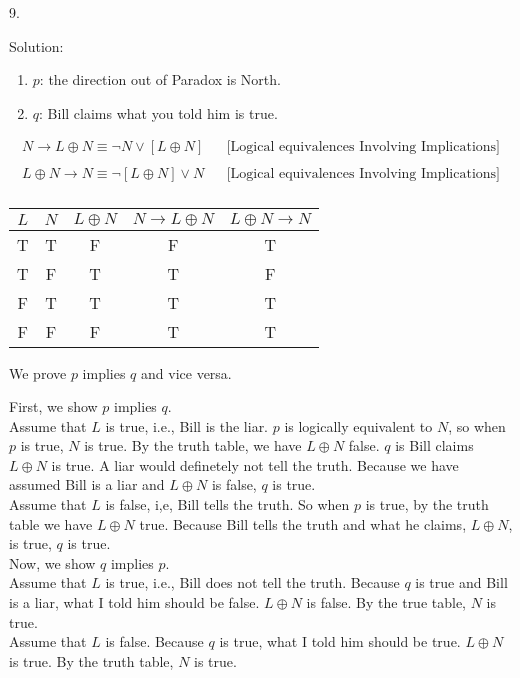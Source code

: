 \documentclass[12pt]{article}
\begin{document}
9. 

\indent Solution:\\
\begin{enumerate}
    \item \label{NisDir} $p$: the direction out of Paradox is North.
    \item \label{BsaysItrue} $q$: Bill claims what you told him is true.
\end{enumerate}
\begin{align*}
N \to L \oplus N \equiv \lnot N \lor [L \oplus N] && \text{[Logical equivalences Involving Implications]}\\ 
\end{align*}
\begin{align*}
L \oplus N \to N \equiv \lnot [L \oplus N] \lor N &&  \text{[Logical equivalences Involving Implications]} \\
\end{align*}

\begin{center}
\begin{tabular}{c|c|c|c|c}
    $L$ & $N$ & $L \oplus N$ & $N \to L \oplus N$ & $L \oplus N \to N$ \\
\hline
T & T & F & F & T \\
T & F & T & T & F \\
F & T & T & T & T \\
F & F & F & T & T
\end{tabular}
\end{center}

We prove $p$ implies $q$ and vice versa.
 
First, we show $p$ implies $q$. \\
\indent Assume that $L$ is true, i.e., Bill is the liar. $p$ is logically equivalent to $N$, so when $p$ is true, $N$ is true. By the truth table, we have $L \oplus N$ false. $q$ is Bill claims $L \oplus N$ is true. A liar would definetely not tell the truth. Because we have assumed Bill is a liar and $L \oplus N$ is false, $q$ is true. \\
\indent Assume that $L$ is false, i,e, Bill tells the truth. So when $p$ is true, by the truth table we have $L \oplus N$ true. Because Bill tells the truth and what he claims, $L \oplus N$, is true, $q$ is true.\\
\indent Now, we show $q$ implies $p$.\\
\indent Assume that $L$ is true, i.e., Bill does not tell the truth. Because $q$ is true and Bill is a liar, what I told him should be false. $L \oplus N$ is false. By the true table, $N$ is true.\\
\indent Assume that $L$ is false. Because $q$ is true, what I told him should be true. $L \oplus N$ is true. By the truth table, $N$ is true.\\
\end{document}
